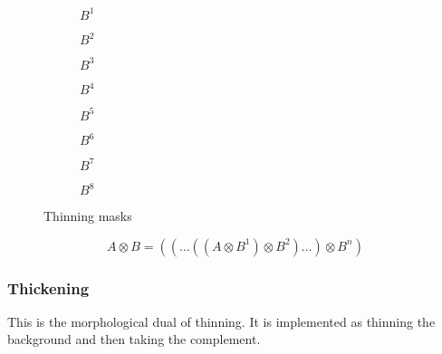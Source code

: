 \begin{figure}[h]
	\centering
	\begin{subfigure}[b]{0.1\textwidth}
		\centering
		\caption{$B^1$}
	\end{subfigure}
	\begin{subfigure}[b]{0.1\textwidth}
		\centering
		\caption{$B^2$}
	\end{subfigure}
	\begin{subfigure}[b]{0.1\textwidth}
		\centering
		\caption{$B^3$}
	\end{subfigure}
	\begin{subfigure}[b]{0.1\textwidth}
		\centering
		\caption{$B^4$}
	\end{subfigure}
	\begin{subfigure}[b]{0.1\textwidth}
		\centering
		\caption{$B^5$}
	\end{subfigure}
	\begin{subfigure}[b]{0.1\textwidth}
		\centering
		\caption{$B^6$}
	\end{subfigure}
	\begin{subfigure}[b]{0.1\textwidth}
		\centering
		\caption{$B^7$}
	\end{subfigure}
	\begin{subfigure}[b]{0.1\textwidth}
		\centering
		\caption{$B^8$}
	\end{subfigure}
	\caption{Thinning masks}
\end{figure}
	\[
		A \otimes  {B} = ((\ldots((A \otimes B^{1}) \otimes B^{2})\ldots) \otimes B^{n})	
	\]	

\subsubsection{Thickening}
This is the morphological dual of thinning. It is implemented as thinning the background and then taking the complement.

